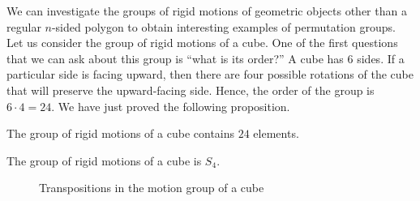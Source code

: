  
We can investigate the groups of rigid motions of  geometric
objects other than a regular $n$-sided polygon to obtain interesting
examples of permutation groups. Let us consider the group of rigid
motions of a cube. One of the first questions that we can ask about
this group is ``what is its order?''  A cube has 6 sides. If
a particular side is facing upward, then there are four possible
rotations of the cube that will preserve the upward-facing side.
Hence, the order of the group is $6 \cdot 4 = 24$. We have just proved
the following proposition.
 
 
\begin{proposition}\label{motions_cube}
The group of rigid motions of a cube contains $24$ elements.
\end{proposition}
 
 
\begin{theorem}
The group of rigid motions of a cube is $S_4$.
\end{theorem}
 

 
\begin{figure}[hbt]
\begin{center}

\end{center}
\caption{Transpositions in the motion group of a cube}
\label{transpose}
\end{figure}
 
